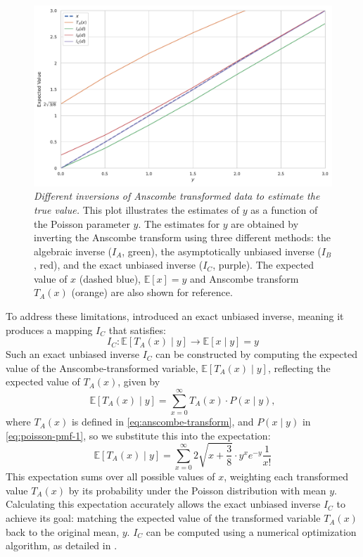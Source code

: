 \begin{figure}
    \centering
    \includegraphics[width=1\linewidth]{images/anscombe_expectation_inversion.pdf}
    \caption{\textit{Different inversions of Anscombe transformed data to estimate the true value.} This plot illustrates the estimates of $y$ as a function of the Poisson parameter $y$. The estimates for $y$ are obtained by inverting the Anscombe transform using three different methods: the algebraic inverse ($I_A$, green), the asymptotically unbiased inverse ($I_B$, red), and the exact unbiased inverse ($I_C$, purple). The expected value of $x$ (dashed blue), $\mathbb{E}[x]=y$ and Anscombe transform $T_A(x)$ (orange) are also shown for reference.}
    \label{fig:anscombe-expectation-inversion}
\end{figure}

To address these limitations, \citeauthor{makitaloOptimalInversionAnscombe2011} introduced an exact unbiased inverse, meaning it produces a mapping $I_C$ that satisfies:
\begin{equation}
    I_C: \mathbb{E}[T_A(x) \mid y] \to \mathbb{E}[x \mid y] = y
\end{equation}
Such an exact unbiased inverse $I_C$ can be constructed by computing the expected value of the Anscombe-transformed variable, $\mathbb{E}[T_A(x) \mid y]$, reflecting the expected value of $T_A(x) $, given by
\begin{equation}   
    \mathbb{E}[T_A(x) \mid y] = \sum_{x=0}^{\infty} T_A(x) \cdot P(x \mid y),
\end{equation}
where $T_A(x)$ is defined in \cref{eq:anscombe-transform}, and $P(x \mid y)$ in \cref{eq:poisson-pmf-1}, so we substitute this into the expectation:
\begin{equation*}
    \mathbb{E}[T_A(x) \mid y] = \sum_{x=0}^{\infty} 2 \sqrt{x + \frac{3}{8}} \cdot y^x e^{-y} \frac{1}{x!}
\end{equation*}
This expectation sums over all possible values of $x$, weighting each transformed value $T_A(x)$ by its probability under the Poisson distribution with mean $y$. Calculating this expectation accurately allows the exact unbiased inverse  $I_C$  to achieve its goal: matching the expected value of the transformed variable $T_A(x)$ back to the original mean, $y$. $I_C$ can be computed using a numerical optimization algorithm, as detailed in \cite{makitaloOptimalInversionAnscombe2011}. 


